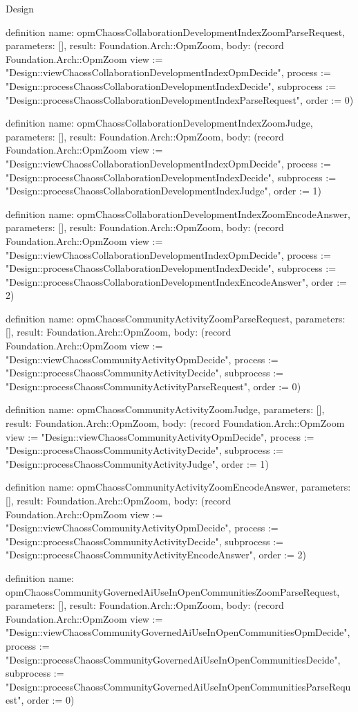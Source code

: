 \begin{lexlean}{Design}
\begin{semanticmodule}
definition{
  name: opmChaossCollaborationDevelopmentIndexZoomParseRequest,
  parameters: [],
  result: Foundation.Arch::OpmZoom,
  body: (record Foundation.Arch::OpmZoom {view := "Design::viewChaossCollaborationDevelopmentIndexOpmDecide", process := "Design::processChaossCollaborationDevelopmentIndexDecide", subprocess := "Design::processChaossCollaborationDevelopmentIndexParseRequest", order := 0})
}

definition{
  name: opmChaossCollaborationDevelopmentIndexZoomJudge,
  parameters: [],
  result: Foundation.Arch::OpmZoom,
  body: (record Foundation.Arch::OpmZoom {view := "Design::viewChaossCollaborationDevelopmentIndexOpmDecide", process := "Design::processChaossCollaborationDevelopmentIndexDecide", subprocess := "Design::processChaossCollaborationDevelopmentIndexJudge", order := 1})
}

definition{
  name: opmChaossCollaborationDevelopmentIndexZoomEncodeAnswer,
  parameters: [],
  result: Foundation.Arch::OpmZoom,
  body: (record Foundation.Arch::OpmZoom {view := "Design::viewChaossCollaborationDevelopmentIndexOpmDecide", process := "Design::processChaossCollaborationDevelopmentIndexDecide", subprocess := "Design::processChaossCollaborationDevelopmentIndexEncodeAnswer", order := 2})
}

definition{
  name: opmChaossCommunityActivityZoomParseRequest,
  parameters: [],
  result: Foundation.Arch::OpmZoom,
  body: (record Foundation.Arch::OpmZoom {view := "Design::viewChaossCommunityActivityOpmDecide", process := "Design::processChaossCommunityActivityDecide", subprocess := "Design::processChaossCommunityActivityParseRequest", order := 0})
}

definition{
  name: opmChaossCommunityActivityZoomJudge,
  parameters: [],
  result: Foundation.Arch::OpmZoom,
  body: (record Foundation.Arch::OpmZoom {view := "Design::viewChaossCommunityActivityOpmDecide", process := "Design::processChaossCommunityActivityDecide", subprocess := "Design::processChaossCommunityActivityJudge", order := 1})
}

definition{
  name: opmChaossCommunityActivityZoomEncodeAnswer,
  parameters: [],
  result: Foundation.Arch::OpmZoom,
  body: (record Foundation.Arch::OpmZoom {view := "Design::viewChaossCommunityActivityOpmDecide", process := "Design::processChaossCommunityActivityDecide", subprocess := "Design::processChaossCommunityActivityEncodeAnswer", order := 2})
}

definition{
  name: opmChaossCommunityGovernedAiUseInOpenCommunitiesZoomParseRequest,
  parameters: [],
  result: Foundation.Arch::OpmZoom,
  body: (record Foundation.Arch::OpmZoom {view := "Design::viewChaossCommunityGovernedAiUseInOpenCommunitiesOpmDecide", process := "Design::processChaossCommunityGovernedAiUseInOpenCommunitiesDecide", subprocess := "Design::processChaossCommunityGovernedAiUseInOpenCommunitiesParseRequest", order := 0})
}


\end{semanticmodule}
\end{lexlean}
